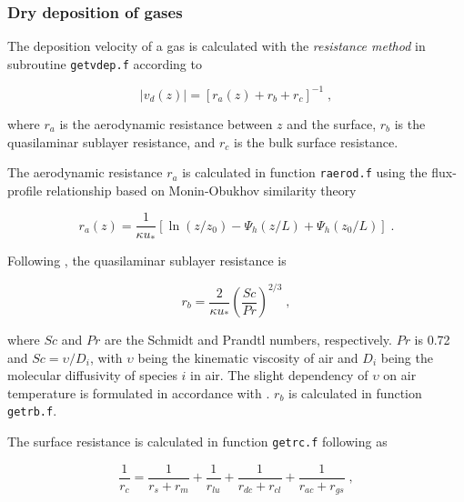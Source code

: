 \documentclass{egu}            %
\begin{document}
\subsubsection{Dry deposition of gases}

The deposition velocity of a gas is calculated with the {\em resistance method}
\citep{wesely1977} in subroutine \verb|getvdep.f| according to

\begin{equation}
|v_d(z)|=\left[r_a(z)+r_b+r_c\right]^{-1} \;,
\end{equation}

where $r_a$ is the aerodynamic resistance between $z$ and the surface, $r_b$ is
the quasilaminar sublayer resistance, and $r_c$ is the bulk surface resistance.

The aerodynamic resistance $r_a$ is calculated in function \verb|raerod.f|
using the flux-profile relationship based on Monin-Obukhov similarity theory
\citep{stull1988}

\begin{equation}
r_a(z)=\frac{1}{\kappa u_*}[\ln(z/z_0)- \Psi _h(z/L)+ \Psi _h(z_0/L)] \;.
\label{ra}
\end{equation}

Following \citet{erisman1994}, the quasilaminar sublayer resistance is

\begin{equation}
r_b=\frac{2}{\kappa u_*} \left(\frac{Sc}{Pr}\right)^{2/3} \;,
\end{equation}

where $Sc$ and $Pr$ are the Schmidt and Prandtl numbers, respectively.  $Pr$ is
0.72 and $Sc=\upsilon/D_i$, with $\upsilon$ being the kinematic viscosity of
air and $D_i$ being the molecular diffusivity of species $i$ in air.  The
slight dependency of $\upsilon$ on air temperature is formulated in accordance
with \citet{pruppacher1978}.  $r_b$ is calculated in function
\verb|getrb.f|.\par

The surface resistance is calculated in function \verb|getrc.f| following
\citet{wesely1989} as

\begin{equation}
\frac{1}{r_c}=
\frac{1}{r_s+r_m}+\frac{1}{r_{lu}}+\frac{1}{r_{dc}+r_{cl}}+\frac{1}{r_{ac}+r_{gs}} \;,
\end{equation}
\end{document}
